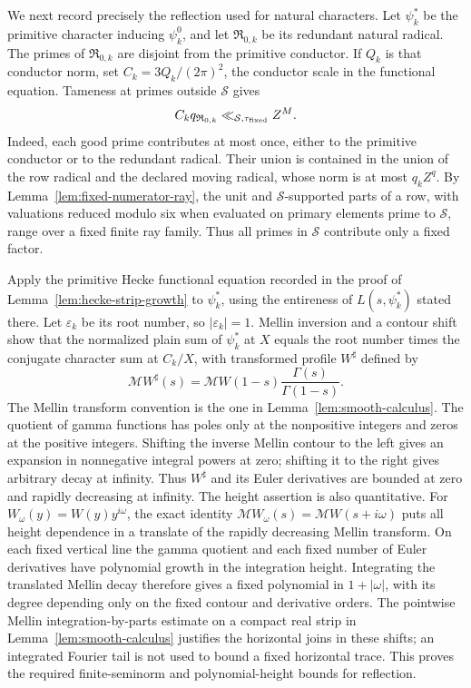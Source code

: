 \documentclass[11pt,a4paper]{article}
\numberwithin{equation}{section}
\numberwithin{figure}{section}
\theoremstyle{definition}
\theoremstyle{remark}
\begin{document}
We next record precisely the reflection used for natural characters.
Let \(\psi_k^*\) be the primitive character inducing \(\psi_k^0\),
and let \(\mathfrak R_{0,k}\) be its redundant natural radical.
The primes of \(\mathfrak R_{0,k}\) are disjoint from the primitive
conductor.  If \(Q_k\) is that conductor norm, set
\(C_k=3Q_k/(2\pi)^2\), the conductor scale in the functional
equation.  Tameness at primes outside \(\mathcal S\) gives
\begin{equation}
 C_kq_{\mathfrak R_{0,k}}
 \ll_{\mathcal S,\tau_{\rm fixed}} Z^M.
 \label{old-eq:2.1c}
\end{equation}
Indeed, each good prime contributes at most once, either to the
primitive conductor or to the redundant radical.  Their union is
contained in the union of the row radical and the declared moving
radical, whose norm is at most \(q_kZ^q\).  By
Lemma~\ref{lem:fixed-numerator-ray}, the unit and
\(\mathcal S\)-supported parts of a row, with valuations reduced
modulo six when evaluated on primary elements prime to \(\mathcal S\),
range over a fixed finite ray
family.  Thus all primes in \(\mathcal S\) contribute only a fixed
factor.

Apply the primitive Hecke functional equation recorded in the proof of
Lemma~\ref{lem:hecke-strip-growth} to \(\psi_k^*\), using the entireness of
\(L(s,\psi_k^*)\) stated there.  Let \(\varepsilon_k\) be its root number,
so \(|\varepsilon_k|=1\).  Mellin inversion and a contour shift show that
the normalized plain sum of \(\psi_k^*\) at \(X\) equals the root number times the conjugate
character sum at \(C_k/X\), with transformed profile \(W^\sharp\)
defined by
\[
 \mathcal M W^\sharp(s)
 =\mathcal M W(1-s)\frac{\Gamma(s)}{\Gamma(1-s)}.
\]
The Mellin transform convention is the one in
Lemma~\ref{lem:smooth-calculus}.  The quotient of gamma functions has
poles only at the nonpositive integers and zeros at the positive
integers.  Shifting the inverse Mellin contour to the left gives an
expansion in nonnegative integral powers at zero; shifting it to the
right gives arbitrary decay at infinity.  Thus \(W^\sharp\) and its
Euler derivatives are bounded at zero and rapidly decreasing at
infinity.  The height assertion is also quantitative.  For
\(W_\omega(y)=W(y)y^{i\omega}\), the exact identity
\(\mathcal M W_\omega(s)=\mathcal M W(s+i\omega)\) puts all
height dependence in a translate of the rapidly decreasing Mellin
transform.  On each fixed vertical line the gamma quotient and
each fixed number of Euler derivatives have polynomial growth in
the integration height.  Integrating the translated Mellin decay
therefore gives a fixed polynomial in \(1+|\omega|\), with its
degree depending only on the fixed contour and derivative orders.
The pointwise Mellin integration-by-parts estimate on a compact real
strip in Lemma~\ref{lem:smooth-calculus} justifies the horizontal
joins in these shifts; an integrated Fourier tail is not used to
bound a fixed horizontal trace.  This proves the required
finite-seminorm and polynomial-height bounds for reflection.
\end{document}
